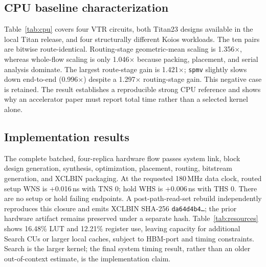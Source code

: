 \documentclass[sigconf,anonymous,review]{acmart}
\begin{document}
\subsection{CPU baseline characterization}

Table~\ref{tab:cpu} covers four VTR circuits, both Titan23 designs available in
the local Titan release, and four structurally different Koios workloads. The
ten pairs are bitwise route-identical. Routing-stage geometric-mean scaling is
1.356$\times$, whereas whole-flow scaling is only 1.046$\times$ because packing,
placement, and serial analysis dominate. The largest route-stage gain is
1.421$\times$; \texttt{spmv} slightly slows down end-to-end (0.996$\times$)
despite a 1.297$\times$ routing-stage gain. This negative case is retained.
The result establishes a reproducible strong CPU reference and shows why an
accelerator paper must report total time rather than a selected kernel alone.

\subsection{Implementation results}

\begin{table}[t]
\centering
\small

\caption{Post-synthesis dynamic-region resources for the complete four-Search,
one-Commit U280 system.}
\label{tab:resources}
\end{table}

The complete batched, four-replica hardware flow passes system link, block
design generation, synthesis, optimization, placement, routing, bitstream
generation, and XCLBIN packaging. At the requested 180\,MHz data clock, routed setup WNS is
+0.016\,ns with TNS 0; hold WHS is +0.006\,ns with THS 0. There are no setup or
hold failing endpoints. A post-path-read-set rebuild independently reproduces
this closure and emits XCLBIN SHA-256 \texttt{da64d4b4\ldots}; the prior
hardware artifact remains preserved under a separate hash.
Table~\ref{tab:resources} shows 16.48\% LUT and 12.21\%
register use, leaving capacity for additional Search CUs or larger local
caches, subject to HBM-port and timing constraints. Search is the larger
kernel; the final system timing result, rather than an older out-of-context
estimate, is the implementation claim.
\end{document}
